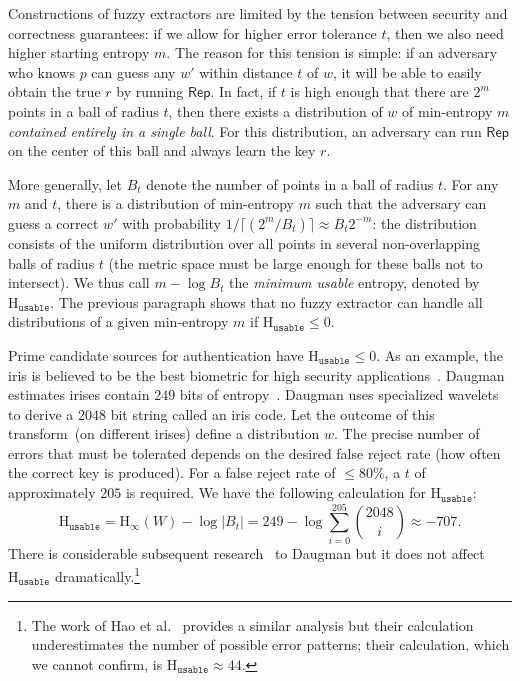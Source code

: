\documentclass[11pt]{article}
\newcommand{\class}[1]{{\ensuremath{\mathsf{#1}}}}
\newcommand{\rep}{\ensuremath{\class{Rep}}\xspace}
\newcommand{\Hoo}{\mathrm{H}_\infty}
\newcommand{\Huse}{\mathrm{H}_{\mathtt{usable}}}
\begin{document}
Constructions of fuzzy extractors are limited by the tension between security and correctness guarantees: if we allow for higher error tolerance $t$, then we also need higher starting entropy $m$. The reason for this tension is simple: if an adversary who knows $p$ can guess any $w'$ within distance $t$ of $w$, it will be able to easily obtain the true $r$ by running $\rep$.
In fact, if $t$ is high enough that there are $2^m$ points in a ball of radius $t$, then there exists a distribution of $w$ of min-entropy $m$  \emph{contained entirely in a single ball}.  For this distribution, an adversary can run $\rep$ on the center of this ball and always learn the key $r$.

More generally, let $B_t$ denote the number of points in a ball of radius $t$. For any $m$ and $t$, there is a distribution of min-entropy $m$ such that the adversary can guess a correct $w'$ with probability $1/\lceil( 2^m/B_t) \rceil\approx B_t 2^{-m}$: the distribution consists of the uniform distribution over all points in several non-overlapping balls of radius $t$ (the metric space must be large enough for these balls not to intersect). We thus call $m-\log B_t$ the \emph{minimum usable} entropy, denoted by $\Huse$. The previous paragraph shows that  no fuzzy extractor can handle all distributions of a given min-entropy $m$ if  $\Huse\le 0$.

Prime candidate sources for authentication have $\Huse\le 0$.  As an example, the iris is believed to be the best biometric for high security applications~\cite{prabhakar2003biometric}.  Daugman estimates irises contain $249$ bits of entropy~\cite{daugman2004}.  Daugman uses specialized wavelets to derive a $2048$ bit string called an iris code.  Let the outcome of this transform~(on different irises) define a distribution $w$.  The precise number of errors that must be tolerated depends on the desired false reject rate (how often the correct key is produced).  For a false reject rate of $\le 80\%$, a $t$ of approximately $205$ is required.  We have the following calculation for $\Huse$:
\[
\Huse = \Hoo(W) - \log |B_t|
= 249 - \log \sum_{i=0}^{205} {2048 \choose i} \approx -707.
\]
There is considerable subsequent research~\cite{gentile2009slic,gentile2009efficient,rathgeb2011combining} to Daugman but it does not affect $\Huse$ dramatically.\footnote{The work of Hao et al.~\cite[Section 4.3]{hao2006combining} provides a similar analysis but their calculation underestimates the number of possible error patterns; their calculation, which we cannot confirm, is $\Huse \approx 44$.}  
\end{document}
